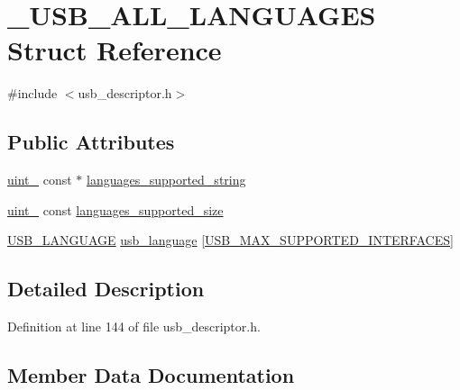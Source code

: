 \hypertarget{struct___u_s_b___a_l_l___l_a_n_g_u_a_g_e_s}{}\section{\+\_\+\+U\+S\+B\+\_\+\+A\+L\+L\+\_\+\+L\+A\+N\+G\+U\+A\+G\+ES Struct Reference}
\label{struct___u_s_b___a_l_l___l_a_n_g_u_a_g_e_s}


{\ttfamily \#include $<$usb\+\_\+descriptor.\+h$>$}

\subsection*{Public Attributes}
\begin{DoxyCompactItemize}
\item 
\hyperlink{types_8h_ad3209046c23f739a81581c10a4be7d92}{uint\+\_} const $\ast$ \hyperlink{struct___u_s_b___a_l_l___l_a_n_g_u_a_g_e_s_ab386d6509768eb969ac327dcafb61c91}{languages\+\_\+supported\+\_\+string}
\item 
\hyperlink{types_8h_ad3209046c23f739a81581c10a4be7d92}{uint\+\_} const \hyperlink{struct___u_s_b___a_l_l___l_a_n_g_u_a_g_e_s_a717b82500018c7be6466dfadd0d114e5}{languages\+\_\+supported\+\_\+size}
\item 
\hyperlink{usb__descriptor_8h_a8dd854dc20dbd7de7ea60e5ae3589ccd}{U\+S\+B\+\_\+\+L\+A\+N\+G\+U\+A\+GE} \hyperlink{struct___u_s_b___a_l_l___l_a_n_g_u_a_g_e_s_a79d81619921ca510eecf662b2ad22d27}{usb\+\_\+language} \mbox{[}\hyperlink{usb__descriptor_8h_a581403dee3f0798c7042219b76e1d93b}{U\+S\+B\+\_\+\+M\+A\+X\+\_\+\+S\+U\+P\+P\+O\+R\+T\+E\+D\+\_\+\+I\+N\+T\+E\+R\+F\+A\+C\+ES}\mbox{]}
\end{DoxyCompactItemize}


\subsection{Detailed Description}


Definition at line 144 of file usb\+\_\+descriptor.\+h.



\subsection{Member Data Documentation}
